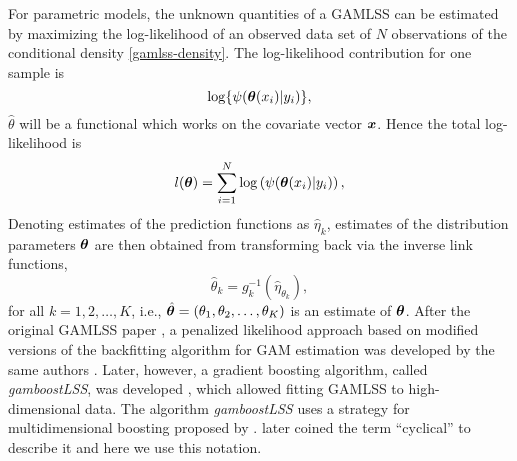 For parametric models, the unknown quantities of a GAMLSS can be estimated by maximizing the log-likelihood of an observed data set of $N$ observations of the conditional density \eqref{gamlss-density}.
The log-likelihood contribution for one sample is
\begin{equation*}
    \log\{\psi(\boldsymbol{\theta}(x_i)|y_i)\},
\end{equation*}
$\hat{\theta}$ will be a functional which works on the covariate vector $\bm{x}$.
Hence the total log-likelihood is
\begin{equation*}
    l(\boldsymbol{\theta})=\sum_{i=1}^N\log\left(\psi(\boldsymbol{\theta}(x_i)|y_i)\right),
\end{equation*}
Denoting estimates of the prediction functions as $\hat{\eta}_k$, estimates of the distribution parameters $\boldsymbol{\theta}$ are then obtained from transforming back via the inverse link functions,
\begin{equation*}
    \hat{\theta}_k=g_k^{-1}(\hat{\eta}_{\theta_k}),
\end{equation*}
for all $k=1,2,\ldots,K$, i.e., $\hat{\boldsymbol{\theta}}=\left(\theta_1,\theta_2,\ldots,\theta_K\right)$ is an estimate of $\boldsymbol{\theta}$.
After the original GAMLSS paper \citep{gamlss}, a penalized likelihood approach based on modified versions of the backfitting algorithm for GAM estimation was developed by the same authors \citep{gamlssR}.
Later, however, a gradient boosting algorithm, called \textit{gamboostLSS}, was developed \citep{gamboostlss-paper}, which allowed fitting GAMLSS to high-dimensional data.
The algorithm \textit{gamboostLSS} uses a strategy for multidimensional boosting proposed by \citet{schmid}.
\citet{thomas2018} later coined the term ``cyclical'' to describe it and here we use this notation.

